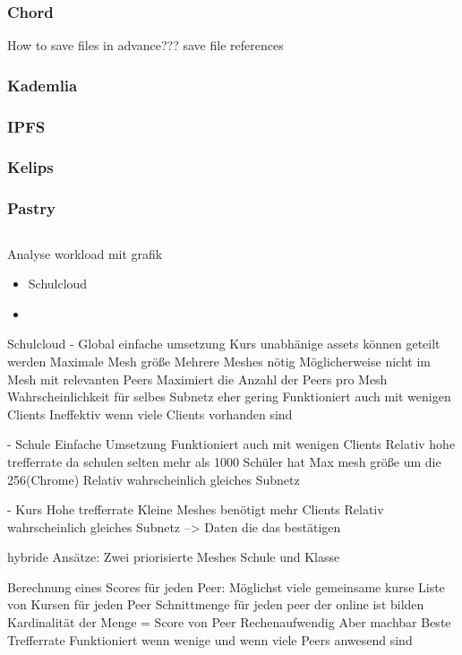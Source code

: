 \subsubsection{Chord}

How to save files in advance???
save file references
\subsubsection{Kademlia}
\subsubsection{IPFS}
\subsubsection{Kelips}
\subsubsection{Pastry}
\subsection{\schulCloud}
Analyse workload mit grafik

\begin{itemize}
	\item Schulcloud
	\item 	
\end{itemize}
Schulcloud
- Global
einfache umsetzung
Kurs unabhänige assets können geteilt werden
Maximale Mesh größe
Mehrere Meshes nötig
Möglicherweise nicht im Mesh mit relevanten Peers
Maximiert die Anzahl der Peers pro Mesh
Wahrscheinlichkeit für selbes Subnetz eher gering
Funktioniert auch mit wenigen Clients
Ineffektiv wenn viele Clients vorhanden sind

- Schule
Einfache Umsetzung
Funktioniert auch mit wenigen Clients
Relativ hohe trefferrate da schulen selten mehr als 1000 Schüler hat
Max mesh größe um die 256(Chrome)
Relativ wahrscheinlich gleiches Subnetz

- Kurs
Hohe trefferrate
Kleine Meshes
benötigt mehr Clients
Relativ wahrscheinlich gleiches Subnetz --> Daten die das bestätigen

hybride Ansätze:
Zwei priorisierte Meshes Schule und Klasse

Berechnung eines Scores für jeden Peer:
Möglichst viele gemeinsame kurse
Liste von Kursen für jeden Peer
Schnittmenge für jeden peer der online ist bilden
Kardinalität der Menge = Score von Peer
Rechenaufwendig Aber machbar
Beste Trefferrate
Funktioniert wenn wenige und wenn viele Peers anwesend sind


